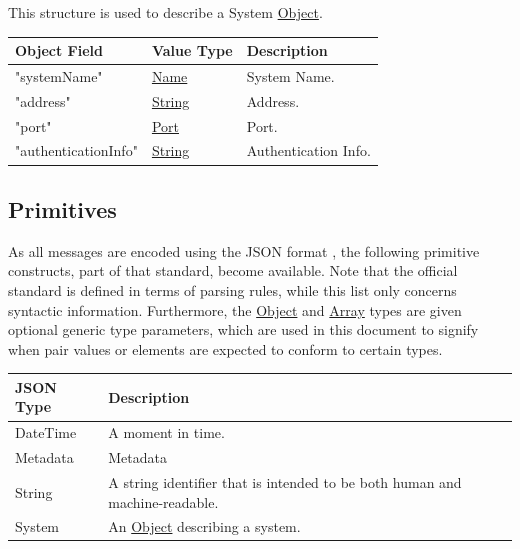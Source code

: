 \documentclass[a4paper]{arrowhead}
\newcommand{\pdef}[1]{{\textcolor{ArrowheadGrey}{#1 \label{sec:model:primitives:#1} \label{sec:model:primitives:#1s}}}}
\newcommand{\pref}[1]{{\textcolor{ArrowheadGrey}{\hyperref[sec:model:primitives:#1]{#1}}}}
\begin{document}

This structure is used to describe a System \pref{Object}. 

\begin{table}[ht!]
\begin{tabularx}{\textwidth}{| p{5cm} | p{6cm} | X |} \hline
\rowcolor{gray!33} Object Field & Value Type                      & Description \\ \hline
"systemName"         & \pref{Name}     & System Name. \\ \hline
"address"            & \pref{String}   & Address. \\ \hline
"port"               & \pref{Port}     & Port. \\ \hline
"authenticationInfo" & \pref{String}   & Authentication Info. \\ \hline
\end{tabularx}
\end{table}

\subsection{Primitives}
\label{sec:model:primitives}

As all messages are encoded using the JSON format \cite{bray2014json}, the following primitive constructs, part of that standard, become available.
Note that the official standard is defined in terms of parsing rules, while this list only concerns syntactic information.
Furthermore, the \pref{Object} and \pref{Array} types are given optional generic type parameters, which are used in this document to signify when pair values or elements are expected to conform to certain types. 

\begin{table}[ht!]
\begin{tabularx}{\textwidth}{| p{3cm} | X |} \hline
\rowcolor{gray!33} JSON Type & Description \\ \hline
\pdef{DateTime}        & A moment in time.  \\ \hline
\pdef{Metadata}        & Metadata \\ \hline 
\pdef{String}             & A string identifier that is intended to be both human and machine-readable. \\ \hline
\pdef{System}           & An \pref{Object} describing a system. \\ \hline
\end{tabularx}
\end{table}
\end{document}
